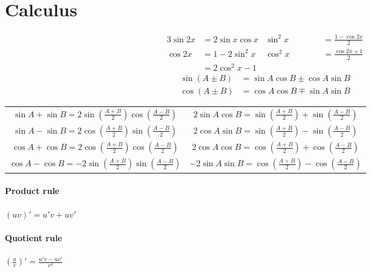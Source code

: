 
\section{Calculus}\label{02c738a}


\begin{alignat*}{3}
	\sin2x & =2\sin x\cos x & \sin^2x                        & =\frac{1-\cos2x}2 \\
	\cos2x & =1-2\sin^2x    & \cos^2x                        & =\frac{\cos2x+1}2 \\
	       & =2\cos^2x-1    & \quad\quad\quad\quad\quad\quad &
\end{alignat*}
\begin{align*}
	\sin(A\pm B) & =\sin A\cos B\pm\cos A\sin B \\
	\cos(A\pm B) & =\cos A\cos B\mp\sin A\sin B
\end{align*}
\begin{center}
	\renewcommand{\arraystretch}{1.5}
	\begin{tabular}{c|c}
		$\sin A+\sin B =2\sin(\frac{A+B}2)\cos(\frac{A-B}2)$  & $2\sin A\cos B=\sin(\frac{A+B}2)+\sin(\frac{A-B}2)$  \\
		$\sin A-\sin B =2\cos(\frac{A+B}2)\sin(\frac{A-B}2)$  & $2\cos A\sin B=\sin(\frac{A+B}2)-\sin(\frac{A-B}2)$  \\
		$\cos A+\cos B =2\cos(\frac{A+B}2)\cos(\frac{A-B}2)$  & $2\cos A\cos B=\cos(\frac{A+B}2)+\cos(\frac{A-B}2)$  \\
		$\cos A-\cos B =-2\sin(\frac{A+B}2)\sin(\frac{A-B}2)$ & $-2\sin A\sin B=\cos(\frac{A+B}2)-\cos(\frac{A-B}2)$
	\end{tabular}
\end{center}


\paragraph{Product rule} $(uv)'=u'v+uv'$


\paragraph{Quotient rule} $\displaystyle\left(\frac
	uv\right)'=\frac{u'v-uv'}{v^2}$

